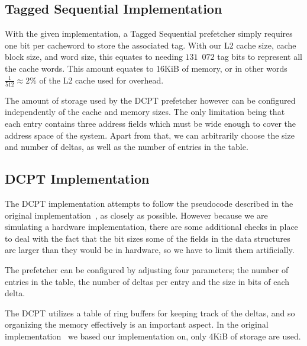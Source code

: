 \subsection{Tagged Sequential Implementation}


With the given implementation, a Tagged Sequential prefetcher simply requires
one bit per cacheword to store the associated tag. With our L2 cache size, cache block size, and word size, this equates to needing $131$~$072$ tag bits to
represent all the cache words. This amount equates to 16KiB of memory, or in
other words $\frac{1}{512} \approx 2\%$ of the L2 cache used for overhead.

The amount of storage used by the DCPT prefetcher however can be configured
independently of the cache and memory sizes. The only limitation being that each
entry contains three address fields which must be wide enough to cover the
address space of the system. Apart from that, we can arbitrarily choose the size
and number of deltas, as well as the number of entries in the table.

\subsection{DCPT Implementation}


The DCPT implementation attempts to follow the pseudocode described in the
original implementation~\cite{dcpt}, as closely as possible. However because we
are simulating a hardware implementation, there are some additional checks in
place to deal
with the fact that the bit sizes some of the fields in the data
structures are larger than they would be in hardware, so we have to limit them
artificially.

The prefetcher can be configured by adjusting four parameters; the number of entries
in the table, the number of deltas per entry and the size in bits of each delta.

The DCPT utilizes a table of ring buffers for keeping track of the deltas, and
so organizing the memory effectively is an important aspect. In the original
implementation~\cite{dcpt} we based our implementation on, only 4KiB of storage
are used.

